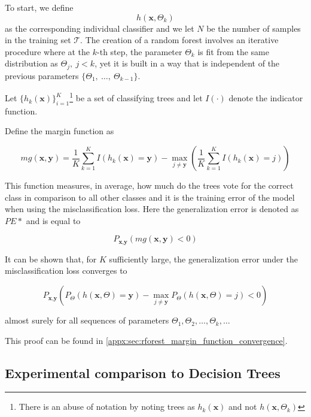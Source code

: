 To start, we define
$$h(\textbf{x},\Theta_k)$$ as the corresponding individual classifier and we let $N$ be the number of samples in the training set $\mathcal{T}$.
The creation of a random forest involves an iterative procedure where at the $k$-th step, the parameter $\Theta_k$ is fit from the same distribution as $\Theta_j, \ j<k$, yet it is built in a way that is independent of the previous parameters $\{\Theta_1, \ \ldots, \ \Theta_{k-1} \}$. %


Let $\{ h_k(\textbf{x}) \}_{i=1}^K$\footnote{There is an abuse of notation by noting trees as $h_k(\textbf{x})$ and not $h(\textbf{x}, \Theta_k)$ } be a set of classifying trees and let $I(\cdot)$ denote the indicator function.

Define the margin function as

\begin{equation}
\label{eq:rf-marginFun}
mg(\textbf{x},\textbf{y}) = \frac{1}{K}  \sum_{k=1}^K I(h_k(\textbf{x}) = \textbf{y})
- \max_{j\neq \textbf{y}}\left(\frac{1}{K} \sum_{k=1}^K I(h_k(\textbf{x}) = j) \right)
\end{equation}


This function measures, in average, how much do the trees vote for the correct class in comparison to all other classes and it is the training error of the model when using the misclassification loss.
Here the generalization error is denoted as $PE*$ and is equal to

\begin{equation}
P_{\textbf{x}, \textbf{y} }(mg(\textbf{x},\textbf{y}) <0)
\end{equation}

 It can be shown that, for $K$ sufficiently large, the generalization error under the misclassification loss converges to

\begin{equation}
 P_{\textbf{x}, \textbf{y} } ( P_{\Theta} (h(\textbf{x}, \Theta) = \textbf{y}) - \max_{j \neq \textbf{y}} P_{\Theta} (h(\textbf{x}, \Theta) = j) < 0)
 \end{equation}

almost surely for all sequences of parameters $\Theta_1,\Theta_2, \ldots, \Theta_k,\ldots$

This proof can be found in \cref{appx:sec:rforest_margin_function_convergence}.


\subsection{ Experimental comparison to Decision Trees}\label{subsection:random_forests_comparison_trees}

